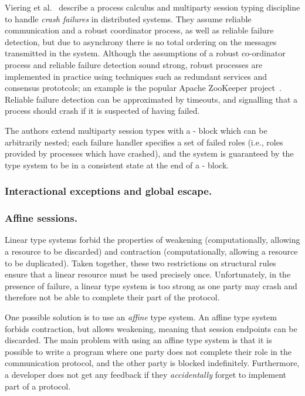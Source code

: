 \documentclass[
graybox,
envcountchap
]{svmult}
\begin{document}
\begin{bibunit}
  Viering et al.~\cite{VieringCEHZ18:crash-handling} describe a process calculus
  and multiparty session typing discipline to handle \emph{crash failures} in
  distributed systems. They assume reliable communication and a robust
  coordinator process, as well as reliable failure detection, but due to
  asynchrony there is no total ordering on the messages transmitted in the
  system.
%
  Although the assumptions of a robust co-ordinator process and reliable failure
  detection sound strong, robust processes are implemented in practice using
  techniques such as redundant services and consensus prototcols; an example is
  the popular Apache ZooKeeper project~\cite{JunqueiraR13:zookeeper}. Reliable
  failure detection can be approximated by timeouts, and signalling that a
  process should crash if it is suspected of having failed.

  The authors extend multiparty session types with a
  - block which can be arbitrarily nested; each failure
  handler specifies a set of failed roles (i.e., roles provided by processes
  which have crashed), and the system is guaranteed by the type system to be in
  a consistent state at the end of a - block.

  \subsubsection{Interactional exceptions and global escape.}



  \subsubsection{Affine sessions.}

  Linear type systems forbid the properties of weakening (computationally,
  allowing a resource to be discarded) and contraction (computationally,
  allowing a resource to be duplicated).  Taken together, these two restrictions
  on structural rules ensure that a linear resource must be used precisely once.
  Unfortunately, in the presence of failure, a linear type system is too strong
  as one party may crash and therefore not be able to complete their part of the
  protocol.

  One possible solution is to use an \emph{affine} type system. An affine type
  system forbids contraction, but allows weakening,
  meaning that session endpoints can be discarded.
%
  The main problem with using an affine type system is that it is possible to
  write a program where one party does not complete their role in the
  communication protocol, and the other party is blocked indefinitely.
  Furthermore, a developer does not get any feedback if they \emph{accidentally}
  forget to implement part of a protocol.


\end{bibunit}
\end{document}
